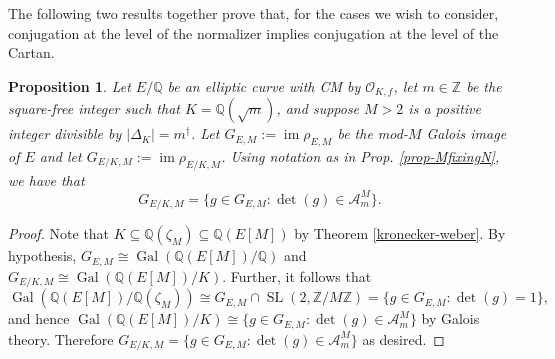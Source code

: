 \documentclass[11pt]{amsart}
\newtheorem{proposition}[defn]{Proposition}
\theoremstyle{definition}
\newcommand{\Q}{\mathbb{Q}}
\newcommand{\Z}{\mathbb{Z}}
\newcommand{\Of}{\mathcal{O}_{K,f}}
\newcommand{\SL}{\operatorname{SL}}
\newcommand{\Gal}{\operatorname{Gal}}
\DeclareMathOperator{\im}{im}  %
\begin{document}




The following two results together prove that, for the cases we wish to consider, conjugation at the level of the normalizer implies conjugation at the level of the Cartan.

\begin{proposition}\label{prop-MfixingN-redux}
    Let $E/\Q$ be an elliptic curve with CM by $\Of$, let $m \in \Z$ be the square-free integer such that $K = \Q(\sqrt{m})$, and suppose $M > 2$ is a positive integer divisible by $|\Delta_K| = m^{\dagger}$. Let $G_{E, M} := \im \rho_{E, M}$ be the mod-$M$ Galois image of $E$ and let $G_{E/K, M} := \im \rho_{E/K, M}$. Using notation as in Prop. \ref{prop-MfixingN}, we have that
    \[ G_{E/K, M} = \{ g \in G_{E, M} : \det(g) \in \mathcal{A}^M_{m}\}. \]
    \end{proposition}

\begin{proof}
    Note that $K \subseteq \Q(\zeta_M) \subseteq \Q(E[M])$ by Theorem \ref{kronecker-weber}. By hypothesis, $G_{E, M} \cong \Gal(\Q(E[M])/\Q)$ and $G_{E/K, M} \cong \Gal(\Q(E[M])/K)$. Further, it follows that 
    \[ \Gal(\Q(E[M])/\Q(\zeta_M)) \cong G_{E, M} \cap \SL(2, \Z/M\Z) = \{ g \in G_{E, M} : \det(g) = 1 \}, \] 
    and hence $\Gal(\Q(E[M])/K) \cong  \{ g \in G_{E, M} : \det(g) \in \mathcal{A}_{m}^{M}  \}$ by Galois theory. Therefore $G_{E/K, M} = \{ g \in G_{E, M} : \det(g) \in \mathcal{A}_{m}^{M}  \}$ as desired.
\end{proof}
\end{document}
